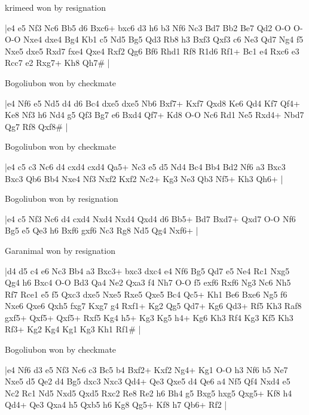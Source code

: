 \showboard

krimeed won by resignation

\makegametitle
|e4 e5 Nf3 Nc6 Bb5 d6 Bxc6+ bxc6 d3 h6 b3 Nf6 Nc3 Bd7 Bb2 Be7 Qd2 O-O O-O-O Nxe4 dxe4 Bg4 Kb1 c5 Nd5 Bg5 Qd3 Rb8 h3 Bxf3 Qxf3 c6 Ne3 Qd7 Ng4 f5 Nxe5 dxe5 Rxd7 fxe4 Qxe4 Rxf2 Qg6 Bf6 Rhd1 Rf8 R1d6 Rf1+ Bc1 e4 Rxc6 e3 Rcc7 e2 Rxg7+ Kh8 Qh7\#  |

\showboard

Bogoliubon won by checkmate

\makegametitle
|e4 Nf6 e5 Nd5 d4 d6 Bc4 dxe5 dxe5 Nb6 Bxf7+ Kxf7 Qxd8 Ke6 Qd4 Kf7 Qf4+ Ke8 Nf3 h6 Nd4 g5 Qf3 Bg7 e6 Bxd4 Qf7+ Kd8 O-O Nc6 Rd1 Ne5 Rxd4+ Nbd7 Qg7 Rf8 Qxf8\#  |

\showboard

Bogoliubon won by checkmate

\makegametitle
|e4 c5 c3 Nc6 d4 cxd4 cxd4 Qa5+ Nc3 e5 d5 Nd4 Bc4 Bb4 Bd2 Nf6 a3 Bxc3 Bxc3 Qb6 Bb4 Nxe4 Nf3 Nxf2 Kxf2 Nc2+ Kg3 Ne3 Qb3 Nf5+ Kh3 Qh6+  |

\showboard

Bogoliubon won by resignation

\makegametitle
|e4 c5 Nf3 Nc6 d4 cxd4 Nxd4 Nxd4 Qxd4 d6 Bb5+ Bd7 Bxd7+ Qxd7 O-O Nf6 Bg5 e5 Qe3 h6 Bxf6 gxf6 Nc3 Rg8 Nd5 Qg4 Nxf6+  |

\showboard

Garanimal won by resignation

\makegametitle
|d4 d5 c4 e6 Nc3 Bb4 a3 Bxc3+ bxc3 dxc4 e4 Nf6 Bg5 Qd7 e5 Ne4 Rc1 Nxg5 Qg4 h6 Bxc4 O-O Bd3 Qa4 Ne2 Qxa3 f4 Nh7 O-O f5 exf6 Rxf6 Ng3 Nc6 Nh5 Rf7 Rce1 e5 f5 Qxc3 dxe5 Nxe5 Rxe5 Qxe5 Bc4 Qc5+ Kh1 Be6 Bxe6 Ng5 f6 Nxe6 Qxe6 Qxh5 fxg7 Kxg7 g4 Rxf1+ Kg2 Qg5 Qd7+ Kg6 Qd3+ Rf5 Kh3 Raf8 gxf5+ Qxf5+ Qxf5+ Rxf5 Kg4 h5+ Kg3 Kg5 h4+ Kg6 Kh3 Rf4 Kg3 Kf5 Kh3 Rf3+ Kg2 Kg4 Kg1 Kg3 Kh1 Rf1\#  |

\showboard

Bogoliubon won by checkmate

\makegametitle
|e4 Nf6 d3 e5 Nf3 Nc6 c3 Bc5 b4 Bxf2+ Kxf2 Ng4+ Kg1 O-O h3 Nf6 b5 Ne7 Nxe5 d5 Qe2 d4 Bg5 dxc3 Nxc3 Qd4+ Qe3 Qxe5 d4 Qe6 a4 Nf5 Qf4 Nxd4 e5 Nc2 Rc1 Nd5 Nxd5 Qxd5 Rxc2 Re8 Re2 h6 Bh4 g5 Bxg5 hxg5 Qxg5+ Kf8 h4 Qd4+ Qe3 Qxa4 h5 Qxb5 h6 Kg8 Qg5+ Kf8 h7 Qb6+ Rf2  |

